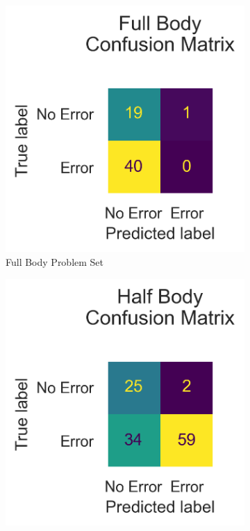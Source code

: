 \begin{figure}
  \centering
  \begin{subfigure}[b]{0.47\linewidth}
      \centering
      \includegraphics[width=\textwidth]{figures/Results/v2/confusion/full_together.png}
      \caption[]{Full Body Problem Set}
      \label{fig:fb_conf}
  \end{subfigure}
  \hfill
  \begin{subfigure}[b]{0.47\linewidth}
      \centering
      \includegraphics[width=\textwidth]{figures/Results/v2/confusion/half_together.png}

\end{subfigure}
\end{figure}
